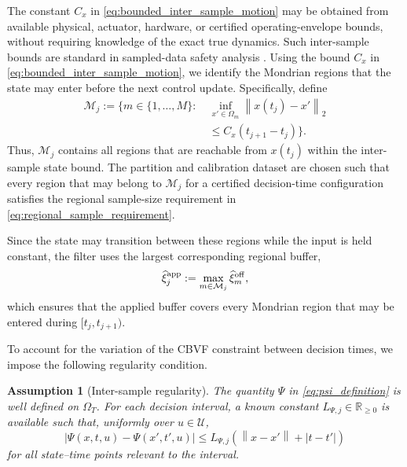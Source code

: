 \documentclass[letterpaper,10pt,conference]{ieeeconf}
\newtheorem{assumption}{Assumption}
\newcommand{\xv}{x}
\newcommand{\uv}{u}
\newcommand{\Uv}{\mathcal{U}}
\newcommand{\norm}[1]{\left\lVert #1 \right\rVert}
\begin{document}
The constant $C_x$ in \eqref{eq:bounded_inter_sample_motion} may be obtained
from available physical, actuator, hardware, or certified operating-envelope
bounds, without requiring knowledge of the exact true dynamics. Such
inter-sample bounds are standard in sampled-data safety analysis
\cite{breeden2022sampled}. Using the bound $C_x$ in \eqref{eq:bounded_inter_sample_motion}, we
identify the Mondrian regions that the state may enter before the next control
update. Specifically, define
\begin{equation}
\begin{aligned}
\mathcal M_j
:=
\biggl\{
m\in\{1,\ldots,M\}:\
&\inf_{\xv'\in\Omega_m}
\norm{\xv(t_j)-\xv'}_2 \\
&\leq C_x(t_{j+1}-t_j)
\biggr\}.
\end{aligned}
\label{eq:reachable_region_set}
\end{equation}
Thus, $\mathcal M_j$ contains all regions that are reachable from $\xv(t_j)$ within the inter-sample state bound. The partition and calibration dataset are
chosen such that every region that may belong to $\mathcal M_j$ for a
certified decision-time configuration satisfies the regional sample-size
requirement in \eqref{eq:regional_sample_requirement}.

Since the state may transition between these regions while the input is held
constant, the filter uses the largest corresponding regional buffer,
\begin{equation}
\widehat\xi^{\rm app}_{j}
:=
\max_{m\in\mathcal M_j}
\widehat\xi^{\rm off}_{m},
\label{eq:applied_reachable_buffer}
\end{equation}
which ensures that the applied buffer covers every Mondrian region that may be
entered during $[t_j,t_{j+1})$.

To account for the variation of the CBVF constraint between decision times, we
impose the following regularity condition.
\begin{assumption}[Inter-sample regularity]
\label{ass:inter_sample_psi}
The quantity $\Psi$ in \eqref{eq:psi_definition} is well defined on
$\Omega_T$. For each decision interval, a known constant
$L_{\Psi,j}\in\mathbb R_{\geq0}$ is available such that, uniformly over
$\uv\in\Uv$,
\begin{equation}
\left|
\Psi(\xv,t,\uv)-\Psi(\xv',t',\uv)
\right|
\leq
L_{\Psi,j}
\left(
\norm{\xv-\xv'}+|t-t'|
\right)
\label{eq:psi_lipschitz}
\end{equation}
for all state--time points relevant to the interval.
\end{assumption}
\end{document}
